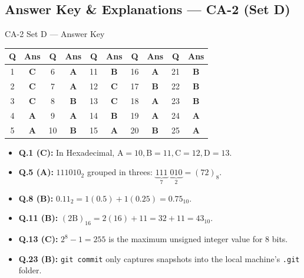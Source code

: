 
\newpage
\subsection*{Answer Key \& Explanations --- CA-2 (Set D)}

\begin{answerkeytable}{CA-2 Set D --- Answer Key}
\begin{tabular}{*{10}{c}}
\toprule
\textbf{Q} & \textbf{Ans} & \textbf{Q} & \textbf{Ans} & \textbf{Q} & \textbf{Ans} & \textbf{Q} & \textbf{Ans} & \textbf{Q} & \textbf{Ans} \\
\midrule
1 & \textbf{C} & 6 & \textbf{A} & 11 & \textbf{B} & 16 & \textbf{A} & 21 & \textbf{B} \\
2 & \textbf{C} & 7 & \textbf{A} & 12 & \textbf{C} & 17 & \textbf{B} & 22 & \textbf{B} \\
3 & \textbf{C} & 8 & \textbf{B} & 13 & \textbf{C} & 18 & \textbf{A} & 23 & \textbf{B} \\
4 & \textbf{A} & 9 & \textbf{A} & 14 & \textbf{B} & 19 & \textbf{A} & 24 & \textbf{A} \\
5 & \textbf{A} & 10 & \textbf{B} & 15 & \textbf{A} & 20 & \textbf{B} & 25 & \textbf{A} \\
\bottomrule
\end{tabular}
\end{answerkeytable}

\begin{expbox}
\begin{itemize}[leftmargin=5mm]
    \item \textbf{Q.1 (C):} In Hexadecimal, $\text{A}=10, \text{B}=11, \text{C}=12, \text{D}=13$.
    \item \textbf{Q.5 (A):} $111010_2$ grouped in threes: $\underbrace{111}_{7}\;\underbrace{010}_{2} = (72)_8$.
    \item \textbf{Q.8 (B):} $0.11_2 = 1(0.5) + 1(0.25) = 0.75_{10}$.
    \item \textbf{Q.11 (B):} $(2\text{B})_{16} = 2(16) + 11 = 32 + 11 = 43_{10}$.
    \item \textbf{Q.13 (C):} $2^8 - 1 = 255$ is the maximum unsigned integer value for 8 bits.
    \item \textbf{Q.23 (B):} \texttt{git commit} only captures snapshots into the local machine's \texttt{.git} folder.
\end{itemize}
\end{expbox}

\newpage
